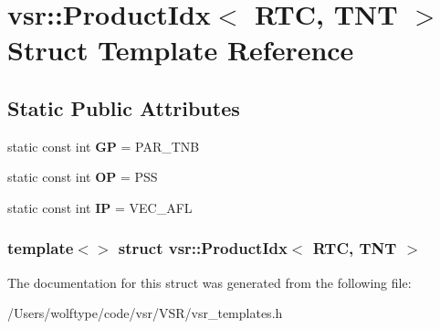 \hypertarget{structvsr_1_1_product_idx_3_01_r_t_c_00_01_t_n_t_01_4}{\section{vsr\-:\-:Product\-Idx$<$ R\-T\-C, T\-N\-T $>$ Struct Template Reference}
\label{structvsr_1_1_product_idx_3_01_r_t_c_00_01_t_n_t_01_4}
}
\subsection*{Static Public Attributes}
\begin{DoxyCompactItemize}
\item 
\hypertarget{structvsr_1_1_product_idx_3_01_r_t_c_00_01_t_n_t_01_4_aba918313ac042aa3672d0cee9a40ac06}{static const int {\bfseries G\-P} = P\-A\-R\-\_\-\-T\-N\-B}\label{structvsr_1_1_product_idx_3_01_r_t_c_00_01_t_n_t_01_4_aba918313ac042aa3672d0cee9a40ac06}

\item 
\hypertarget{structvsr_1_1_product_idx_3_01_r_t_c_00_01_t_n_t_01_4_a5e48cab284628dfe0869aed67356ac60}{static const int {\bfseries O\-P} = P\-S\-S}\label{structvsr_1_1_product_idx_3_01_r_t_c_00_01_t_n_t_01_4_a5e48cab284628dfe0869aed67356ac60}

\item 
\hypertarget{structvsr_1_1_product_idx_3_01_r_t_c_00_01_t_n_t_01_4_afc7848645fb71972f0649bc8778d2930}{static const int {\bfseries I\-P} = V\-E\-C\-\_\-\-A\-F\-L}\label{structvsr_1_1_product_idx_3_01_r_t_c_00_01_t_n_t_01_4_afc7848645fb71972f0649bc8778d2930}

\end{DoxyCompactItemize}
\subsubsection*{template$<$$>$ struct vsr\-::\-Product\-Idx$<$ R\-T\-C, T\-N\-T $>$}



The documentation for this struct was generated from the following file\-:\begin{DoxyCompactItemize}
\item 
/\-Users/wolftype/code/vsr/\-V\-S\-R/vsr\-\_\-templates.\-h\end{DoxyCompactItemize}
